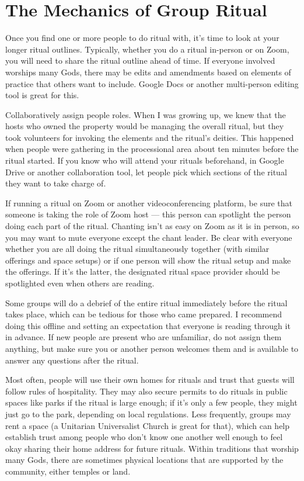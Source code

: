 \documentclass[
]{book}
\begin{document}
\hypertarget{the-mechanics-of-group-ritual}{%
\section{The Mechanics of Group Ritual}\label{the-mechanics-of-group-ritual}}

Once you find one or more people to do ritual with, it's time to look at your longer ritual outlines. Typically, whether you do a ritual in-person or on Zoom, you will need to share the ritual outline ahead of time. If everyone involved worships many Gods, there may be edits and amendments based on elements of practice that others want to include. Google Docs or another multi-person editing tool is great for this.

Collaboratively assign people roles. When I was growing up, we knew that the hosts who owned the property would be managing the overall ritual, but they took volunteers for invoking the elements and the ritual's deities. This happened when people were gathering in the processional area about ten minutes before the ritual started. If you know who will attend your rituals beforehand, in Google Drive or another collaboration tool, let people pick which sections of the ritual they want to take charge of.

If running a ritual on Zoom or another videoconferencing platform, be sure that someone is taking the role of Zoom host --- this person can spotlight the person doing each part of the ritual. Chanting isn't as easy on Zoom as it is in person, so you may want to mute everyone except the chant leader. Be clear with everyone whether you are all doing the ritual simultaneously together (with similar offerings and space setups) or if one person will show the ritual setup and make the offerings. If it's the latter, the designated ritual space provider should be spotlighted even when others are reading.

Some groups will do a debrief of the entire ritual immediately before the ritual takes place, which can be tedious for those who came prepared. I recommend doing this offline and setting an expectation that everyone is reading through it in advance. If new people are present who are unfamiliar, do not assign them anything, but make sure you or another person welcomes them and is available to answer any questions after the ritual.

Most often, people will use their own homes for rituals and trust that guests will follow rules of hospitality. They may also secure permits to do rituals in public spaces like parks if the ritual is large enough; if it's only a few people, they might just go to the park, depending on local regulations. Less frequently, groups may rent a space (a Unitarian Universalist Church is great for that), which can help establish trust among people who don't know one another well enough to feel okay sharing their home address for future rituals. Within traditions that worship many Gods, there are sometimes physical locations that are supported by the community, either temples or land.
\end{document}
